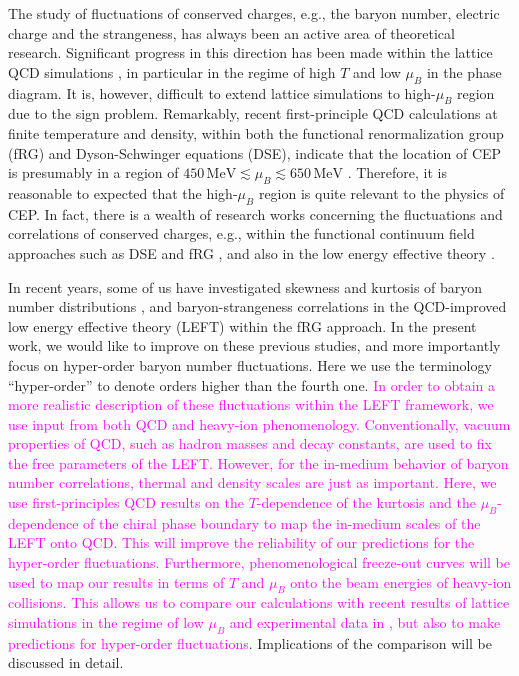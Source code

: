 \documentclass[%
reprint,
superscriptaddress,
showpacs,preprintnumbers,
 amsmath,amssymb,
 aps,
prd,
]{revtex4-1}
\newcommand{\colfab}[1]{\textcolor{magenta}{#1}}
\begin{document}
The study of fluctuations of conserved charges, e.g., the baryon number, electric charge and the strangeness, has always been an active area of theoretical research. Significant progress in this direction has been made within the lattice QCD simulations \cite{Bazavov:2012vg,Borsanyi:2013hza,Borsanyi:2014ewa,Bazavov:2017dus,Bazavov:2017tot,Borsanyi:2018grb,Bazavov:2020bjn}, in particular in the regime of high $T$ and low $\mu_B$ in the phase diagram. It is, however, difficult to extend lattice simulations to high-$\mu_B$ region due to the sign problem. Remarkably, recent first-principle QCD calculations at finite temperature and density, within both the functional renormalization group (fRG) and Dyson-Schwinger equations (DSE), indicate that the location of CEP is presumably in a region of $450\,\mathrm{MeV} \lesssim\mu_B\lesssim 650\,\mathrm{MeV}$ \cite{Fischer:2018sdj,Fu:2019hdw,Isserstedt:2019pgx,Gao:2020qsj}. Therefore, it is reasonable to expected that the high-$\mu_B$ region is quite relevant to the physics of CEP. In fact, there is a wealth of research works concerning the fluctuations and correlations of conserved charges, e.g., within the functional continuum field approaches such as DSE \cite{Xin:2014ela,Isserstedt:2019pgx} and fRG \cite{Skokov:2010wb,Skokov:2010uh,Morita:2014fda,Fu:2015naa,Fu:2015amv,Fu:2015naa,Almasi:2017bhq,Fu:2018qsk,Fu:2018swz}, and also in the low energy effective theory \cite{Fu:2009wy,Fu:2010ay,Karsch:2010hm,Schaefer:2011ex,Li:2018ygx}.

In recent years, some of us have investigated skewness and kurtosis of baryon number distributions \cite{Fu:2015naa,Fu:2015amv,Fu:2016tey}, and baryon-strangeness correlations \cite{Fu:2018qsk,Fu:2018swz} in the QCD-improved low energy effective theory (LEFT) within the fRG approach. In the present work, we would like to improve on these previous studies, and more importantly focus on hyper-order baryon number fluctuations. Here we use the terminology ``hyper-order'' to denote orders higher than the fourth one.
\colfab{In order to obtain a more realistic description of these fluctuations within the LEFT framework, we use input from both QCD and heavy-ion phenomenology. Conventionally, vacuum properties of QCD, such as hadron masses and decay constants, are used to fix the free parameters of the LEFT. However, for the in-medium behavior of baryon number correlations, thermal and density scales are just as important. Here, we use first-principles QCD results on the $T$-dependence of the kurtosis and the $\mu_B$-dependence of the chiral phase boundary to map the in-medium scales of the LEFT onto QCD. This will improve the reliability of our predictions for the hyper-order fluctuations. Furthermore, phenomenological freeze-out curves will be used to map our results in terms of $T$ and $\mu_B$ onto the beam energies of heavy-ion collisions.
This allows us to
compare our calculations with recent results of lattice simulations in the regime of low $\mu_B$ and experimental data in \cite{Adam:2020unf,Nonaka:2020crv,Pandav:2020uzx}, but also to make predictions for hyper-order fluctuations}. Implications of the comparison will be discussed in detail.
\end{document}
